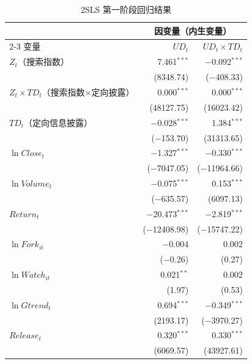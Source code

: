 \documentclass[
    type = master, %
    degree = professional,        %
    decl-page,  %
    twoside,                %
    fontset = fandol %
  ]{njuthesis}
\begin{document}
\begin{table}[htbp]
    \centering
    \caption{2SLS 第一阶段回归结果}
    \label{tab:first-stage}
    \small
    \begin{tabularx}{\textwidth}{Xrr}
        \toprule
        & \multicolumn{2}{c}{因变量（内生变量）} \\
        \cmidrule(lr){2-3}
        变量
            & $\mathit{UD}_t$ & $\mathit{UD}_t \times \mathit{TD}_t$ \\
        \midrule
        $Z_t$（搜索指数）
            & 7.461$^{***}$ & $-$0.092$^{***}$ \\
            & (8348.74) & ($-$408.33) \\[0.4em]
        $Z_t \times \mathit{TD}_t$（搜索指数$\times$定向披露）
            & 0.000$^{***}$ & 0.000$^{***}$ \\
            & (48127.75) & (16023.42) \\[0.4em]
        $\mathit{TD}_t$（定向信息披露）
            & $-$0.028$^{***}$ & 1.384$^{***}$ \\
            & ($-$153.70) & (31313.65) \\[0.4em]
        $\ln\mathit{Close}_t$
            & $-$1.327$^{***}$ & $-$0.330$^{***}$ \\
            & ($-$7047.05) & ($-$11964.66) \\[0.4em]
        $\ln\mathit{Volume}_t$
            & $-$0.075$^{***}$ & 0.153$^{***}$ \\
            & ($-$635.57) & (6097.13) \\[0.4em]
        $\mathit{Return}_t$
            & $-$20.473$^{***}$ & $-$2.819$^{***}$ \\
            & ($-$12408.98) & ($-$15747.22) \\[0.4em]
        $\ln\mathit{Fork}_{it}$
            & $-$0.004 & 0.002 \\
            & ($-$0.26) & (0.27) \\[0.4em]
        $\ln\mathit{Watch}_{it}$
            & 0.021$^{**}$ & 0.002 \\
            & (1.97) & (0.53) \\[0.4em]
        $\ln\mathit{Gtrend}_t$
            & 0.694$^{***}$ & $-$0.349$^{***}$ \\
            & (2193.17) & ($-$3970.27) \\[0.4em]
        $\mathit{Release}_t$
            & 0.320$^{***}$ & 0.330$^{***}$ \\
            & (6069.57) & (43927.61) \\
        \midrule

\end{tabularx}
\end{table}
\end{document}
